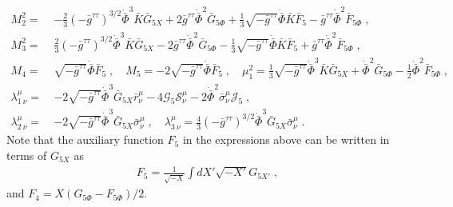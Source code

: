 \documentclass[a4paper,11pt]{article}
\numberwithin{equation}{section}
\begin{document}
\begin{align}
M_2^2 = \ & -\frac{2}{3} (-\bar{g}^{\tau\tau})^{3/2} \dot{\bar{\Phi}}^3 \bar{K} \bar{G}_{5X} + 2 \bar{g}^{\tau\tau} \dot{\bar{\Phi}}^2 \bar{G}_{5\Phi} + \frac{1}{3}\sqrt{-\bar{g}^{\tau\tau}} \dot{\bar{\Phi}} \bar{K} \bar{F}_5 - \bar{g}^{\tau\tau} \dot{\bar{\Phi}}^2 \bar{F}_{5\Phi} \;, \nonumber \\ 
M_3^2 = \ & \frac{2}{3} (-\bar{g}^{\tau\tau})^{3/2} \dot{\bar{\Phi}}^3 \bar{K} \bar{G}_{5X}  - 2 \bar{g}^{\tau\tau} \dot{\bar{\Phi}}^2 \bar{G}_{5\Phi} - \frac{1}{3} \sqrt{-\bar{g}^{\tau\tau}} \dot{\bar{\Phi}} \bar{K} \bar{F}_5 + \bar{g}^{\tau\tau} \dot{\bar{\Phi}}^2 \bar{F}_{5\Phi}  \nonumber \;, \\
M_4 = \ & \sqrt{-\bar{g}^{\tau\tau}} \dot{\bar{\Phi}} \bar{F}_5 \;, \quad M_5 = - 2\sqrt{-\bar{g}^{\tau\tau}} \dot{\bar{\Phi}} \bar{F}_5 \;, \quad \mu_1^2 = \frac{1}{3}\sqrt{-\bar{g}^{\tau\tau}} \dot{\bar{\Phi}}^3 \bar{K} \bar{G}_{5X} +  \dot{\bar{\Phi}}^2 \bar{G}_{5\Phi} - \frac{1}{2} \dot{\bar{\Phi}}^2 \bar{F}_{5\Phi} \nonumber \;, \\
\lambda^\mu_{1 \ \nu} = \ & -2 \sqrt{-\bar{g}^{\tau\tau}} \dot{\bar{\Phi}}^3 \bar{G}_{5X} \bar{r}^\mu_\nu - 4 \mathcal{G}_5 \mathcal{S}^\mu_\nu - 2 \dot{\bar{\Phi}}^2 \bar{\sigma}^\mu_\nu \mathcal{J}_5 \;, \nonumber \\
\lambda^\mu_{2 \ \nu} = \ & -2 \sqrt{-\bar{g}^{\tau\tau}} \dot{\bar{\Phi}}^3 \bar{G}_{5X}\bar{\sigma}^\mu_\nu \;, \quad \lambda^\mu_{3 \ \nu} = \frac{4}{3} (-\bar{g}^{\tau\tau})^{3/2} \dot{\bar{\Phi}}^3 \bar{G}_{5X}\bar{\sigma}^\mu_\nu \;. \nonumber
\end{align}
Note that the auxiliary function $F_5$ in the expressions above can be written in terms of $G_{5X}$ as
\begin{align}
F_5 = \frac{1}{\sqrt{-X}} \int dX' \sqrt{-X'} G_{5X'} \;,
\end{align}
and $F_4 = X(G_{5\Phi} - F_{5\Phi})/2$.
{}


\end{document}
